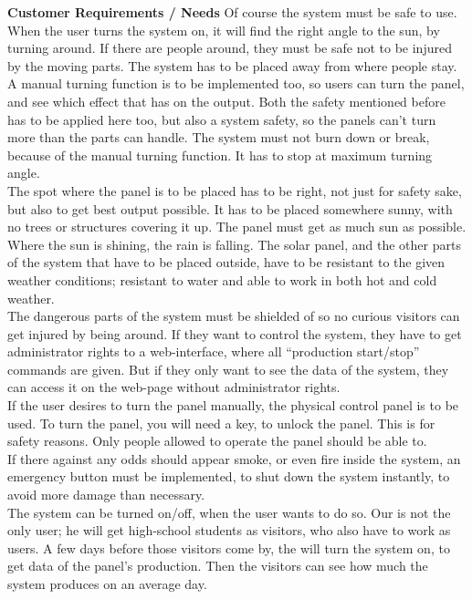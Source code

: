 \documentclass[12pt,a4paper]{report}
\begin{document}
\textbf{Customer Requirements / Needs}
Of course the system must be safe to use. When the user turns the system on, it will find the right angle to the sun, by turning around. If there are people around, they must be safe not to be injured by the moving parts. The system has to be placed away from where people stay.\\

A manual turning function is to be implemented too, so users can turn the panel, and see which effect that has on the output. Both the safety mentioned before has to be applied here too, but also a system safety, so the panels can’t turn more than the parts can handle. The system must not burn down or break, because of the manual turning function. It has to stop at maximum turning angle.\\

The spot where the panel is to be placed has to be right, not just for safety sake, but also to get best output possible. It has to be placed somewhere sunny, with no trees or structures covering it up. The panel must get as much sun as possible.\\

Where the sun is shining, the rain is falling. The solar panel, and the other parts of the system that have to be placed outside, have to be resistant to the given weather conditions; resistant to water and able to work in both hot and cold weather.\\

The dangerous parts of the system must be shielded of so no curious visitors can get injured by being around. If they want to control the system, they have to get administrator rights to a web-interface, where all “production start/stop” commands are given. But if they only want to see the data of the system, they can access it on the web-page without administrator rights.\\

If the user desires to turn the panel manually, the physical control panel is to be used. To turn the panel, you will need a key, to unlock the panel. This is for safety reasons. Only people allowed to operate the panel should be able to.\\

If there against any odds should appear smoke, or even fire inside the system, an emergency button must be implemented, to shut down the system instantly, to avoid more damage than necessary.\\

The system can be turned on/off, when the user wants to do so. Our  is not the only user; he will get high-school students as visitors, who also have to work as users. A few days before those visitors come by, the will turn the system on, to get data of the panel’s production. Then the visitors can see how much the system produces on an average day.\\
\end{document}
